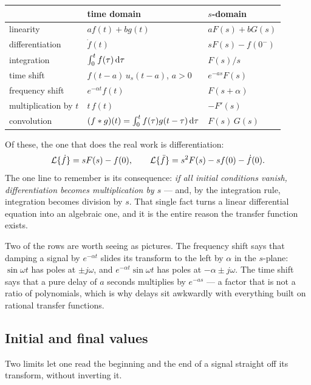 \documentclass[11pt]{article}
\begin{document}
\begin{center}\small
\renewcommand{\arraystretch}{1.55}
\begin{tabular}{@{}lll@{}}
\toprule
& time domain & $s$-domain\\
\midrule
linearity        & $a f(t)+b g(t)$            & $aF(s)+bG(s)$\\
differentiation  & $\dot f(t)$                & $sF(s)-f(0^{-})$\\
integration      & $\int_{0}^{t} f(\tau)\,\mathrm{d}\tau$ & $F(s)/s$\\
time shift       & $f(t-a)\,u_s(t-a)$, $a>0$  & $e^{-as}F(s)$\\
frequency shift  & $e^{-\alpha t}f(t)$        & $F(s+\alpha)$\\
multiplication by $t$ & $t\,f(t)$             & $-F'(s)$\\
convolution      & $(f*g)(t)=\int_0^t f(\tau)g(t-\tau)\,\mathrm{d}\tau$ & $F(s)\,G(s)$\\
\bottomrule
\end{tabular}
\end{center}

Of these, the one that does the real work is differentiation:
\begin{equation}\label{eq:diffrule}
   \mathcal{L}\{\dot f\} = sF(s) - f(0),
   \qquad
   \mathcal{L}\{\ddot f\} = s^{2}F(s) - s f(0) - \dot f(0).
\end{equation}
The one line to remember is its consequence: \emph{if all initial conditions
vanish, differentiation becomes multiplication by $s$} --- and, by the
integration rule, integration becomes division by $s$. That single fact turns a
linear differential equation into an algebraic one, and it is the entire reason
the transfer function exists.

\begin{remark}
Two of the rows are worth seeing as pictures. The frequency shift says that
damping a signal by $e^{-\alpha t}$ slides its transform to the left by $\alpha$
in the $s$-plane: $\sin\omega t$ has poles at $\pm j\omega$, and
$e^{-\alpha t}\sin\omega t$ has poles at $-\alpha\pm j\omega$. The time shift
says that a pure delay of $a$ seconds multiplies by $e^{-as}$ --- a factor that is
not a ratio of polynomials, which is why delays sit awkwardly with everything
built on rational transfer functions.
\end{remark}

\subsection{Initial and final values}\label{sec:fvt}
Two limits let one read the beginning and the end of a signal straight off its
transform, without inverting it.
\end{document}
